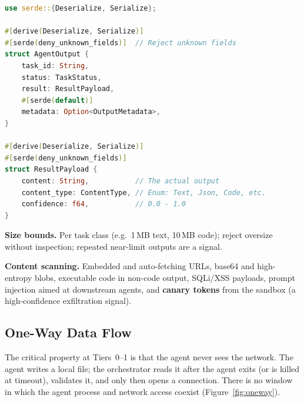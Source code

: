 \documentclass[11pt,letterpaper]{article}
\begin{document}
\begin{lstlisting}[language=rust]
use serde::{Deserialize, Serialize};

#[derive(Deserialize, Serialize)]
#[serde(deny_unknown_fields)]  // Reject unknown fields
struct AgentOutput {
    task_id: String,
    status: TaskStatus,
    result: ResultPayload,
    #[serde(default)]
    metadata: Option<OutputMetadata>,
}

#[derive(Deserialize, Serialize)]
#[serde(deny_unknown_fields)]
struct ResultPayload {
    content: String,           // The actual output
    content_type: ContentType, // Enum: Text, Json, Code, etc.
    confidence: f64,           // 0.0 - 1.0
}
\end{lstlisting}

\textbf{Size bounds.} Per task class (e.g.\ 1\,MB text, 10\,MB code); reject oversize without inspection; repeated near-limit outputs are a signal.

\textbf{Content scanning.} Embedded and auto-fetching URLs, base64 and high-entropy blobs, executable code in non-code output, SQLi/XSS payloads, prompt injection aimed at downstream agents, and \textbf{canary tokens} from the sandbox (a high-confidence exfiltration signal).

\subsection{One-Way Data Flow}

The critical property at Tiers~0--1 is that the agent never sees the network. The agent writes a local file; the orchestrator reads it after the agent exits (or is killed at timeout), validates it, and only then opens a connection. There is no window in which the agent process and network access coexist (Figure~\ref{fig:oneway}).
\end{document}
